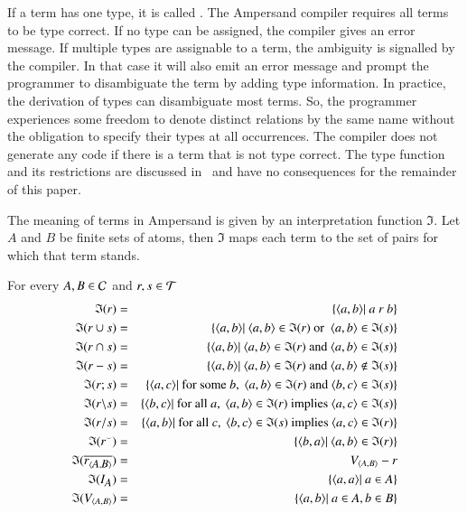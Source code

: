\documentclass{elsarticle}
\begin{document}
	If a term has one type, it is called .
	The Ampersand compiler requires all terms to be type correct.
	If no type can be assigned, the compiler gives an error message.
	If multiple types are assignable to a term, the ambiguity is signalled by the compiler.
	In that case it will also emit an error message and prompt the programmer to disambiguate the term by adding type information.
	In practice, the derivation of types can disambiguate most terms.
	So, the programmer experiences some freedom to denote distinct relations by the same name without the obligation to specify their types at all occurrences.
	The compiler does not generate any code if there is a term that is not type correct.
	The type function and its restrictions are discussed in~\cite{Joosten2015}
	and have no consequences for the remainder of this paper.

 	The meaning of terms in Ampersand is given by an interpretation function $\mathfrak{I}$.
	Let $A$ and $B$ be finite sets of atoms, then $\mathfrak{I}$ maps each term to the set of pairs for which that term stands.
\begin{definition}
\label{interpretation of terms}
\item   For every $A,B\in\mathcal{C}$ and $r,s\in\mathcal{T}$
\begin{eqnarray}
	\mathfrak{I}(r)		 &=&\{\langle{a},{b}\rangle|\ a\ r\ b\}	\\
	\mathfrak{I}(r \cup s)	 &=&\{\langle{a},{b}\rangle|\ \langle{a},{b}\rangle\in\mathfrak{I}(r)\ \text{or }\ \langle{a},{b}\rangle\in\mathfrak{I}(s)\}	\\
	\mathfrak{I}(r \cap s)	 &=&\{\langle{a},{b}\rangle|\ \langle{a},{b}\rangle\in\mathfrak{I}(r)\ \text{and}\ \langle{a},{b}\rangle\in\mathfrak{I}(s)\}	\\
	\mathfrak{I}(r-s)	 &=&\{\langle{a},{b}\rangle|\ \langle{a},{b}\rangle\in\mathfrak{I}(r)\ \text{and}\ \langle{a},{b}\rangle\notin\mathfrak{I}(s)\}	\\
	\mathfrak{I}(r;s)	 &=&\{\langle{a},{c}\rangle|\ \text{for some}\ b,\ \langle{a},{b}\rangle\in\mathfrak{I}(r)\ \text{and}\ \langle{b},{c}\rangle\in\mathfrak{I}(s)\}	\\
	\mathfrak{I}(r\backslash s)	 &=&\{\langle{b},{c}\rangle|\ \text{for all}\ a,\ \langle{a},{b}\rangle\in\mathfrak{I}(r)\ \text{implies}\ \langle{a},{c}\rangle\in\mathfrak{I}(s)\}	\\
	\mathfrak{I}(r\slash s)	 &=&\{\langle{a},{b}\rangle|\ \text{for all}\ c,\ \langle{b},{c}\rangle\in\mathfrak{I}(s)\ \text{implies}\ \langle{a},{c}\rangle\in\mathfrak{I}(r)\}	\\
	\mathfrak{I}({r}^\smallsmile)	 &=&\{\langle{b},{a}\rangle|\ \langle{a},{b}\rangle\in\mathfrak{I}(r)    \}	\\
	\mathfrak{I}(\overline{\text{\em r\/}_{\langle{\text{\em \small A\/}},{\text{\em \small B\/}}\rangle}})	 &=&V_{\langle{A},{B}\rangle}-r	\\
	\mathfrak{I}(I_{\text{\em \small A\/}}) 	 &=&\{\langle{a},{a}\rangle|\ a\in A\}	\\
	\mathfrak{I}(V_{\langle{A},{B}\rangle})&=&\{\langle{a},{b}\rangle|\ a\in A, b\in B\}
\end{eqnarray}
\end{definition}
\end{document}
